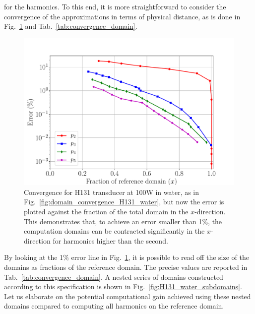 \documentclass[preprint]{JASA}
\begin{document}
for the harmonics. To this end, it is more straightforward to consider the 
convergence of the approximations in terms of physical distance, as is done in 
Fig.~\ref{fig:domain_convergence_in_space_H131_water} and Tab.~\ref{tab:convergence_domain}.
\begin{figure}[h!]
    \centering
    \includegraphics[width=\linewidth]{figures/domain_convergence_space_x_waterH131_power100}
    \caption{Convergence for H131 transducer at 100W in water, as in Fig.~\ref{fig:domain_convergence_H131_water},
    but now the error is plotted against the fraction of the total domain in the $x$-direction.
    This demonstrates that, to achieve an error smaller than 1\%, the computation 
    domains can be contracted significantly in the $x$-direction for harmonics higher than the second.}
    \label{fig:domain_convergence_in_space_H131_water}
\end{figure}

By looking at the 1\% error line in Fig.~\ref{fig:domain_convergence_in_space_H131_water},
it is possible to read off the size of the domains as fractions of the reference
domain. The precise values are reported in Tab.~\ref{tab:convergence_domain}.
A nested series of domains constructed according to this specification is shown 
in Fig.~\ref{fig:H131_water_subdomains}. Let us elaborate on the potential 
computational gain achieved using these nested domains compared to computing 
all harmonics on the reference domain.
\end{document}
